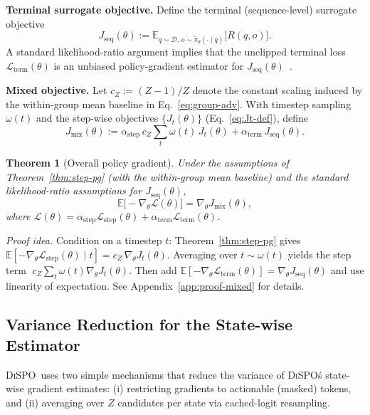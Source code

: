 \documentclass{article}
\newcommand{\method}{{\textsc{DiSPO}}}
\theoremstyle{plain}
\newtheorem{theorem}{Theorem}[section]
\theoremstyle{definition}
\theoremstyle{remark}
\begin{document}
\textbf{Terminal surrogate objective.}
Define the terminal (sequence-level) surrogate objective
\begin{equation}
  J_{\text{seq}}(\theta)
  :=
  \mathbb{E}_{q \sim \mathcal{D},\, o \sim \tilde{\pi}_\theta(\cdot \mid q)}
  \bigl[ R(q,o) \bigr].
  \label{eq:Jseq-def}
\end{equation}
A standard likelihood-ratio argument implies that the unclipped terminal loss $\mathcal{L}_{\text{term}}(\theta)$ is an unbiased policy-gradient estimator for $J_{\text{seq}}(\theta)$~\citep{shao2024deepseekmath}.

\textbf{Mixed objective.}
Let $c_Z := (Z-1)/Z$ denote the constant scaling induced by the within-group mean baseline in Eq.~\ref{eq:group-adv}.
With timestep sampling $\omega(t)$ and the step-wise objectives $\{J_t(\theta)\}$ (Eq.~\ref{eq:Jt-def}), define
\begin{equation}
J_{\text{mix}}(\theta)
  :=
  \alpha_{\text{step}}\,c_Z \sum_t \omega(t)\, J_t(\theta)
  + \alpha_{\text{term}}\, J_{\text{seq}}(\theta).
  \label{eq:Jmix-def}
\end{equation}

\begin{theorem}[Overall policy gradient]\label{thm:mixed}
Under the assumptions of Theorem~\ref{thm:step-pg} (with the within-group mean baseline) and the standard likelihood-ratio assumptions for $J_{\text{seq}}(\theta)$,
\begin{equation}
  \mathbb{E}\bigl[-\nabla_\theta \mathcal{L}(\theta)\bigr]
  =
  \nabla_\theta J_{\text{mix}}(\theta),
  \label{eq:mixed-main}
\end{equation}
where $\mathcal{L}(\theta)=\alpha_{\text{step}}\mathcal{L}_{\text{step}}(\theta)+\alpha_{\text{term}}\mathcal{L}_{\text{term}}(\theta)$.
\end{theorem}

\emph{Proof idea.}
Condition on a timestep $t$: Theorem~\ref{thm:step-pg} gives $\mathbb{E}[-\nabla_\theta \mathcal{L}_{\text{step}}(\theta)\mid t]=c_Z\,\nabla_\theta J_t(\theta)$.
Averaging over $t\sim\omega(t)$ yields the step term $\;c_Z\sum_t \omega(t)\nabla_\theta J_t(\theta)$.
Then add $\mathbb{E}[-\nabla_\theta \mathcal{L}_{\text{term}}(\theta)]=\nabla_\theta J_{\text{seq}}(\theta)$ and use linearity of expectation.
See Appendix~\ref{app:proof-mixed} for details.




\subsection{Variance Reduction for the State-wise Estimator}
\label{sec:theory-var}
\method\ uses two simple mechanisms that reduce the variance of \method\'s state-wise gradient estimates: (i) restricting gradients to actionable (masked) tokens, and (ii) averaging over $Z$ candidates per state via cached-logit resampling.
\end{document}
